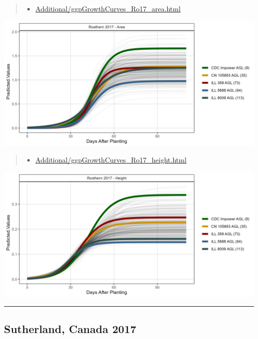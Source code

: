 \documentclass[
]{article}
\providecommand{\tightlist}{%
  \setlength{\itemsep}{0pt}\setlength{\parskip}{0pt}}
\begin{document}
\begin{quote}
\begin{itemize}
\tightlist
\item
  \href{https://derekmichaelwright.github.io/AGILE_LDP_UAV/Additional/ggpGrowthCurves_Ro17_area.html}{Additional/ggpGrowthCurves\_Ro17\_area.html}
\end{itemize}
\end{quote}

\includegraphics{Additional/ggGrowthCurves_Ro17_area.png}

\begin{quote}
\begin{itemize}
\tightlist
\item
  \href{https://derekmichaelwright.github.io/AGILE_LDP_UAV/Additional/ggpGrowthCurves_Ro17_height.html}{Additional/ggpGrowthCurves\_Ro17\_height.html}
\end{itemize}
\end{quote}

\includegraphics{Additional/ggGrowthCurves_Ro17_height.png}

\begin{center}\rule{0.5\linewidth}{0.5pt}\end{center}

\subsection{Sutherland, Canada 2017}\label{sutherland-canada-2017}
\end{document}
